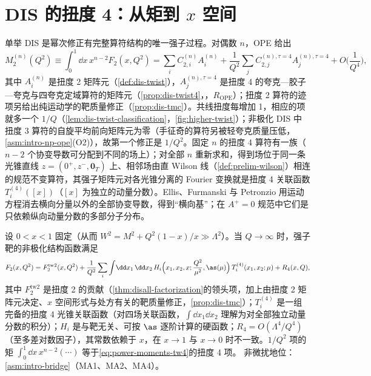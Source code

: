 \section{DIS 的扭度 4：从矩到 \texorpdfstring{$x$}{x} 空间}\label{sec:power-twist4}

单举 DIS 是幂次修正有完整算符结构的唯一强子过程。对偶数 $n$，OPE 给出
\begin{equation}\label{eq:power-moments-tw4}
M_2^{(n)}(Q^2)\equiv\int_0^1\!\dd x\,x^{n-2}F_2(x,Q^2)
=\sum_iC^{(n)}_{2,i}A^{(n)}_i+\frac1{Q^2}\sum_jC^{(n),\tau=4}_{2,j}A^{(n),\tau=4}_j+O\Big(\frac{1}{Q^4}\Big),
\end{equation}
其中 $A^{(n)}_i$ 是扭度 2 矩阵元（\cref{def:dis-twist}），$A^{(n),\tau=4}_j$ 是扭度 4 的夸克—胶子—夸克与四夸克定域算符的矩阵元（\cref{prop:dis-twist4}，\tagR，$R_{\mathrm{OPE}}$）；扭度 2 算符的迹项另给出纯运动学的靶质量修正（\cref{prop:dis-tmc}）。共线扭度每增加 1，相应的项就多一个 $1/Q$（\cref{lem:dis-twist-classification}，\cref{fig:higher-twist}）；非极化 DIS 中扭度 3 算符的自旋平均前向矩阵元为零（手征奇的算符另被轻夸克质量压低，\cref{asm:intro-np-ope}(O2)），故第一个修正是 $1/Q^2$。固定 $n$ 的扭度 4 算符有一族（$n-2$ 个协变导数可分配到不同的场上）；对全部 $n$ 重新求和，得到场位于同一条光锥直线 $z=(0^+,z^-,\mathbf0_T)$ 上、相邻场由直 Wilson 线（\cref{def:prelim-wilson}）相连的规范不变算符，其强子矩阵元对各光锥分离的 Fourier 变换就是扭度 4 关联函数 $T^{(4)}_i([x])$（$[x]$ 为独立的动量分数）。Ellis、Furmanski 与 Petronzio 用运动方程消去横向分量以外的全部协变导数，得到“横向基”\cite{EllisFurmanskiPetronzio1982,EllisFurmanskiPetronzio1983}；在 $A^+=0$ 规范中它们是只依赖纵向动量分数的多部分子分布\cite{Jaffe1983}。

\begin{proposition}\label{prop:power-dis-twist4-x}
设 $0<x<1$ 固定（从而 $W^2=M^2+Q^2(1-x)/x\gg\Lambda^2$）。当 $Q\to\infty$ 时，强子靶的非极化结构函数满足
\begin{equation}\label{eq:power-twist4-x}
F_2(x,Q^2)=F_2^{\mathrm{tw2}}(x,Q^2)+\frac{1}{Q^2}\sum_i\int\!\dd x_1\,\dd x_2\,H_i\Big(x_1,x_2,x;\frac{Q^2}{\mu^2},\as(\mu)\Big)\,T^{(4)}_i(x_1,x_2;\mu)+R_4(x,Q),
\end{equation}
其中 $F_2^{\mathrm{tw2}}$ 是扭度 2 的贡献（\cref{thm:disall-factorization}的领头项，加上由扭度 2 矩阵元决定、$x$ 空间形式与处方有关的靶质量修正，\cref{prop:dis-tmc}）；$T^{(4)}_i$ 是一组完备的扭度 4 光锥关联函数（对四场关联函数，$\int\dd x_1\dd x_2$ 理解为对全部独立动量分数的积分）；$H_i$ 是与靶无关、可按 $\as$ 逐阶计算的硬函数；$R_4=O(\Lambda^4/Q^4)$（至多差对数因子），其常数依赖于 $x$，在 $x\to1$ 与 $x\to0$ 时不一致。$1/Q^2$ 项的矩 $\int_0^1\dd x\,x^{n-2}(\cdots)$ 等于\eqref{eq:power-moments-tw4}的扭度 4 项。
非微扰地位：\cref{asm:intro-bridge}（MA1、MA2、MA4）。
\end{proposition}

